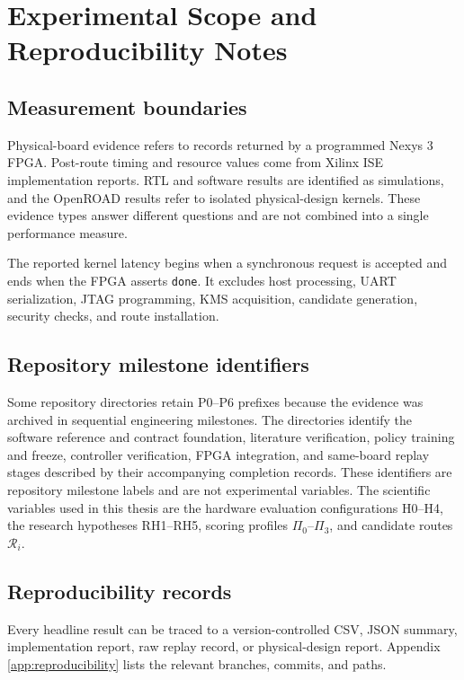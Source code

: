 \chapter{Experimental Scope and Reproducibility Notes}
\label{app:scope-notes}

\section{Measurement boundaries}

Physical-board evidence refers to records returned by a programmed Nexys 3 FPGA.
Post-route timing and resource values come from Xilinx ISE implementation reports.
RTL and software results are identified as simulations, and the OpenROAD results
refer to isolated physical-design kernels. These evidence types answer different
questions and are not combined into a single performance measure.

The reported kernel latency begins when a synchronous request is accepted and ends
when the FPGA asserts \texttt{done}. It excludes host processing, UART
serialization, JTAG programming, KMS acquisition, candidate generation, security
checks, and route installation.

\section{Repository milestone identifiers}

Some repository directories retain P0--P6 prefixes because the evidence was
archived in sequential engineering milestones. The directories identify the
software reference and contract foundation, literature verification, policy
training and freeze, controller verification, FPGA integration, and same-board
replay stages described by their accompanying completion records. These identifiers
are repository milestone labels and are not experimental variables. The scientific
variables used in this thesis are the hardware evaluation configurations H0--H4,
the research hypotheses RH1--RH5, scoring profiles $\Pi_0$--$\Pi_3$, and candidate
routes $\mathcal{R}_i$.

\section{Reproducibility records}

Every headline result can be traced to a version-controlled CSV, JSON summary,
implementation report, raw replay record, or physical-design report. Appendix
\ref{app:reproducibility} lists the relevant branches, commits, and paths.
